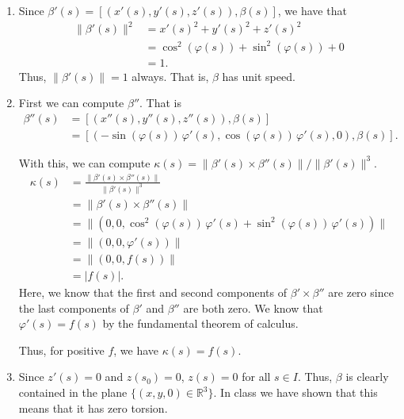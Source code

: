\documentclass[12 pt, letterpaper]{hmcpset}
\begin{document}
\begin{solution}
	\begin{enumerate}
		\item Since $\beta'(s) = [(x'(s), y'(s), z'(s)), \beta(s)]$, we have that
			\[
				\begin{split}
					\lVert \beta'(s) \rVert^{2} & = x'(s)^{2} + y'(s)^{2} + z'(s)^{2} \\
								    & = \cos^{2}{(\varphi(s))} + \sin^{2}{(\varphi(s))} + 0 \\
								    & = 1.
				\end{split}
			\]
			Thus, $\lVert \beta'(s) \rVert = 1$ always. That is, $\beta$ has unit speed.
		\item First we can compute $\beta''$. That is
			\[
				\begin{split}
					\beta''(s) & = [(x''(s), y''(s), z''(s)), \beta(s)] \\
						   & = [(-\sin{(\varphi(s))} \, \varphi'(s), \cos{(\varphi(s))} \, \varphi'(s),  0), \beta(s)].
				\end{split}
			\]
			
			With this, we can compute $\kappa(s) = \lVert \beta'(s) \times \beta''(s) \rVert/\lVert \beta'(s) \rVert^{3}$.
			\[
				\begin{split}
					\kappa(s) & = \frac{\lVert \beta'(s) \times \beta''(s) \rVert}{\lVert \beta'(s) \rVert^{3}} \\
						  & = \lVert \beta'(s) \times \beta''(s) \rVert \\
						  & = \lVert (0, 0, \cos^{2}{(\varphi(s))} \, \varphi'(s) + \sin^{2}{(\varphi(s))} \, \varphi'(s)) \rVert \\
						  & = \lVert (0, 0, \varphi'(s)) \rVert \\
						  & = \lVert (0, 0, f(s)) \rVert \\
						  & = \lvert f(s) \rvert.
				\end{split}
			\]
			Here, we know that the first and second components of $\beta' \times \beta''$ are zero since the last components of $\beta'$ and $\beta''$ are both zero. We know that $\varphi'(s) = f(s)$ by the fundamental theorem of calculus. 

			Thus, for positive $f$, we have $\kappa(s) = f(s)$.
		\item Since $z'(s) = 0$ and $z(s_{0}) = 0$, $z(s) = 0$ for all $s \in I$. Thus, $\beta$ is clearly contained in the plane $\{ (x, y, 0) \in \mathbb{R}^{3} \}$. In class we have shown that this means that it has zero torsion.
	\end{enumerate}
\end{solution}
\end{document}
